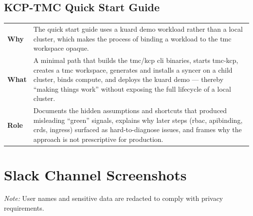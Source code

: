 \documentclass[11pt, a4paper, oneside, listof=totoc]{scrartcl}
\makeatletter
\newcommand{\codesummary}[3]{%
    \vspace{0.4\baselineskip}%
    \noindent\begin{tabularx}{\linewidth}{@{}>{\bfseries}l X@{}}
    Why  & #1\\
    What & #2\\
    Role & #3\\
    \end{tabularx}%
    \vspace{0.2\baselineskip}%
}
\makeatother
\begin{document}
            \subsection{KCP-TMC Quick Start Guide}
                \codesummary
                    {The quick start guide uses a \gls{kuard} demo workload rather than a local cluster, which makes the process of binding a workload to the \gls{tmc} workspace opaque.}
                    {A minimal path that builds the \gls{tmc}/\gls{kcp} \gls{cli} binaries, starts \gls{tmc}-\gls{kcp}, creates a \gls{tmc} workspace, generates and installs a syncer on a child cluster, binds compute, and deploys the \gls{kuard} demo --- thereby \enquote{making things work} without exposing the full lifecycle of a local cluster.}
                    {Documents the hidden assumptions and shortcuts that produced misleading \enquote{green} signals, explains why later steps (\gls{rbac}, \gls{apibinding}, \glspl{crd}, ingress) surfaced as hard-to-diagnose issues, and frames why the approach is not prescriptive for production.}

        \clearpage

        \section{Slack Channel Screenshots}\label{app:slack}

            \noindent\textit{Note:} User names and sensitive data are redacted to comply with privacy requirements.
\end{document}

